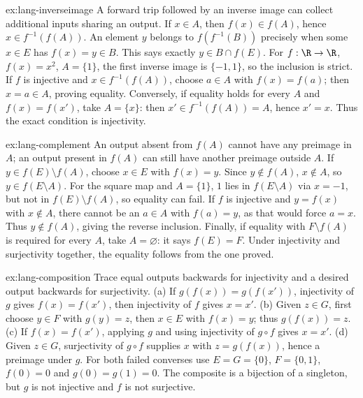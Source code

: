 \begin{solution}{ex:lang-inverseimage}
\idea A forward trip followed by an inverse image can collect additional inputs sharing an output.
\writeup If $x\in A$, then $f(x)\in f(A)$, hence $x\in f^{-1}(f(A))$.
An element $y$ belongs to $f(f^{-1}(B))$ precisely when some $x\in E$ has
$f(x)=y\in B$. This says exactly $y\in B\cap f(E)$.
For $f:\R\to\R$, $f(x)=x^2$, $A=\{1\}$, the first inverse image is
$\{-1,1\}$, so the inclusion is strict.
If $f$ is injective and $x\in f^{-1}(f(A))$, choose $a\in A$ with
$f(x)=f(a)$; then $x=a\in A$, proving equality. Conversely, if equality
holds for every $A$ and $f(x)=f(x')$, take $A=\{x\}$: then
$x'\in f^{-1}(f(A))=A$, hence $x'=x$. Thus the exact condition is injectivity.
\end{solution}

\begin{solution}{ex:lang-complement}
\idea An output absent from $f(A)$ cannot have any preimage in $A$; an output present
in $f(A)$ can still have another preimage outside $A$.
\writeup If $y\in f(E)\setminus f(A)$, choose $x\in E$ with $f(x)=y$.
Since $y\notin f(A)$, $x\notin A$, so $y\in f(E\setminus A)$.
For the square map and $A=\{1\}$, $1$ lies in $f(E\setminus A)$ via $x=-1$,
but not in $f(E)\setminus f(A)$, so equality can fail.
If $f$ is injective and $y=f(x)$ with $x\notin A$, there cannot be an
$a\in A$ with $f(a)=y$, as that would force $a=x$. Thus $y\notin f(A)$,
giving the reverse inclusion. Finally, if equality with $F\setminus f(A)$
is required for every $A$, take $A=\varnothing$: it says $f(E)=F$.
Under injectivity and surjectivity together, the equality follows from the one proved.
\end{solution}

\begin{solution}{ex:lang-composition}
\idea Trace equal outputs backwards for injectivity and a desired output backwards for surjectivity.
\writeup (a) If $g(f(x))=g(f(x'))$, injectivity of $g$ gives $f(x)=f(x')$,
then injectivity of $f$ gives $x=x'$. (b) Given $z\in G$, first choose
$y\in F$ with $g(y)=z$, then $x\in E$ with $f(x)=y$; thus $g(f(x))=z$.
(c) If $f(x)=f(x')$, applying $g$ and using injectivity of $g\circ f$ gives $x=x'$.
(d) Given $z\in G$, surjectivity of $g\circ f$ supplies $x$ with
$z=g(f(x))$, hence a preimage under $g$.
For both failed converses use $E=G=\{0\}$, $F=\{0,1\}$, $f(0)=0$ and
$g(0)=g(1)=0$. The composite is a bijection of a singleton, but $g$ is
not injective and $f$ is not surjective.
\end{solution}

